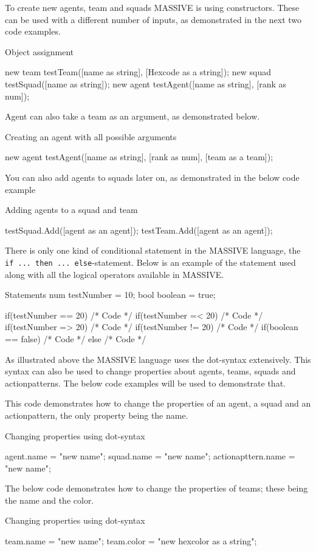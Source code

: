 To create new agents, team and squads MASSIVE is using constructors. These can be used with a different number of inputs, as demonstrated in the next two code examples.
\begin{source}{Object assignment}{}

new team testTeam([name as string], [Hexcode as a string]);
new squad testSquad([name as string]);
new agent testAgent([name as string], [rank as num]);

\end{source}

Agent can also take a team as an argument, as demonstrated below.
\begin{source}{Creating an agent with all possible arguments}{}

new agent testAgent([name as string], [rank as num], [team as a team]);

\end{source}

You can also add agents to squads later on, as demonstrated in the below code example
\begin{source}{Adding agents to a squad and team}{}

testSquad.Add([agent as an agent]);
testTeam.Add([agent as an agent]);

\end{source}

There is only one kind of conditional statement in the MASSIVE language, the \texttt{if ... then ... else}-statement. Below is an example of the statement used along with all the logical operators available in MASSIVE.

\begin{source}{Statements}{}
num testNumber = 10;
bool boolean = true;

if(testNumber == 20)
{
		/* Code */
}
if(testNumber =< 20)
{
		/* Code */
}
if(testNumber => 20)
{
		/* Code */
}
if(testNumber != 20)
{
		/* Code */
}
if(boolean == false)
{
		/* Code */
}
else
{
		/* Code */
}
\end{source}

As illustrated above the MASSIVE language uses the dot-syntax extensively. This syntax can also be used to change properties about agents, teams, squads and actionpatterns. The below code examples will be used to demonstrate that.

This code demonstrates how to change the properties of an agent, a squad and an actionpattern, the only property being the name.

\begin{source}{Changing properties using dot-syntax}{}

agent.name = "new name";
squad.name = "new name";
actionapttern.name = "new name";

\end{source}

The below code demonstrates how to change the properties of teams; these being the name and the color.

\begin{source}{Changing properties using dot-syntax}{}

team.name = "new name";
team.color = "new hexcolor as a string";

\end{source}

